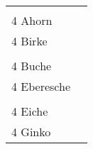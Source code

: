 \documentclass{article}\usepackage[ngerman]{babel}\usepackage{geometry}\usepackage{lmodern}
\begin{document}
\begin{table}[p]
  \begin{tabular}{ll}    \hspace{-2em}    \fbox{\begin{minipage}[t][6cm][t]{8cm}
        \fontsize{45}{54} \selectfont
        \phantom{ }\\
      \phantom{ }4 Ahorn    \end{minipage}}
    &
\fbox{\begin{minipage}[t][6cm][t]{8cm}
        \fontsize{45}{54} \selectfont
        \phantom{ }\\
        \phantom{ } 4 Birke      \end{minipage}}\\    \hspace{-2em}    \fbox{\begin{minipage}[t][6cm][t]{8cm}
        \fontsize{45}{54} \selectfont
        \phantom{ }\\
      \phantom{ }4 Buche    \end{minipage}}
    &
\fbox{\begin{minipage}[t][6cm][t]{8cm}
        \fontsize{45}{54} \selectfont
        \phantom{ }\\
        \phantom{ } 4 Eberesche      \end{minipage}}\\    \hspace{-2em}    \fbox{\begin{minipage}[t][6cm][t]{8cm}
        \fontsize{45}{54} \selectfont
        \phantom{ }\\
      \phantom{ }4 Eiche    \end{minipage}}
    &
\fbox{\begin{minipage}[t][6cm][t]{8cm}
        \fontsize{45}{54} \selectfont
        \phantom{ }\\
        \phantom{ } 4 Ginko      \end{minipage}}\\\end{tabular}
\end{table}
\end{document}
